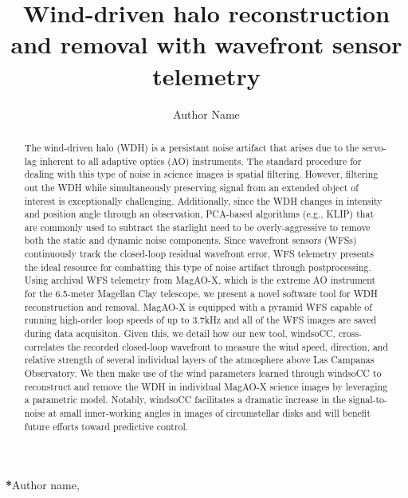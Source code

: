 \documentclass[12pt]{spieman}  %
\title{Wind-driven halo reconstruction and removal with wavefront sensor telemetry}
\author[a,*]{Author Name}
\affil[a]{Affiliation}
\begin{document}
\maketitle

\begin{abstract}
The wind-driven halo (WDH) is a persistant noise artifact that arises due to the servo-lag inherent to all adaptive optics (AO) instruments. The standard procedure for dealing with this type of noise in science images is spatial
filtering. However, filtering out the WDH while simultaneously preserving signal from an extended object of interest is exceptionally challenging. Additionally, since the WDH changes in intensity and position angle through an observation, PCA-based algorithms (e.g., KLIP) that are commonly used to subtract the starlight need to be overly-aggressive to remove both the static and dynamic noise components. Since wavefront sensors (WFSs) continuously track the closed-loop residual wavefront error, WFS telemetry presents the ideal resource for combatting this type of noise artifact through postprocessing. Using archival WFS telemetry from MagAO-X, which is the extreme AO instrument for the 6.5-meter Magellan Clay telescope, we present a novel software tool for WDH reconstruction and removal. MagAO-X is equipped with a pyramid WFS capable of running high-order loop speeds of up to 3.7kHz and all of the WFS images are saved during data acquisiton. Given this, we detail how our new tool, windsoCC, cross-correlates the recorded closed-loop wavefront to measure the wind speed, direction, and relative strength of several individual layers of the atmosphere above Las Campanas Observatory. We then make use of the wind parameters learned through windsoCC to reconstruct and remove the WDH in individual MagAO-X science images by leveraging a parametric model. Notably, windsoCC facilitates a dramatic increase in the signal-to-noise at small inner-working angles in images of circumstellar disks and will benefit future efforts toward predictive control.
\end{abstract}


{\noindent \footnotesize\textbf{*}Author name,  }
\end{document}
